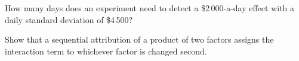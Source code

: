 \begin{interviewq}\label{iq:hf:pnl-analytics-and-the-strategy-lifecycle:5}
How many days does an experiment need to detect a \$2\,000-a-day effect with a daily standard deviation of \$4\,500?
\end{interviewq}

\begin{interviewq}\label{iq:hf:pnl-analytics-and-the-strategy-lifecycle:6}
Show that a sequential attribution of a product of two factors assigns the interaction term to whichever factor is changed second.
\end{interviewq}
